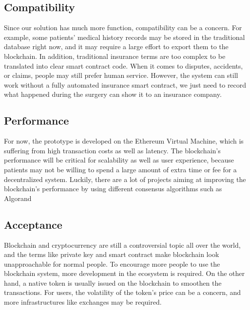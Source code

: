 \documentclass{article}
\begin{document}
\subsection{Compatibility}
Since our solution has much more function, compatibility can be a concern. For example, some patients' medical history records may be stored in the traditional database right now, and it may require a large effort to export them to the blockchain. In addition, traditional insurance terms are too complex to be translated into clear smart contract code. When it comes to disputes, accidents, or claims, people may still prefer human service. However, the system can still work without a fully automated insurance smart contract, we just need to record what happened during the surgery can show it to an insurance company. 
\subsection{Performance}
For now, the prototype is developed on the Ethereum Virtual Machine, which is suffering from high transaction costs as well as latency. The blockchain's performance will be critical for scalability as well as user experience, because patients may not be willing to spend a large amount of extra time or fee for a decentralized system. Luckily, there are a lot of projects aiming at improving the blockchain's performance by using different consensus algorithms such as Algorand\cite{algorand}
\subsection{Acceptance}
Blockchain and cryptocurrency are still a controversial topic all over the world, and the terms like private key and smart contract make blockchain look unapproachable for normal people. To encourage more people to use the blockchain system, more development in the ecosystem is required. On the other hand, a native token is usually issued on the blockchain to smoothen the transactions. For users, the volatility of the token's price can be a concern, and more infrastructures like exchanges may be required.
\end{document}
